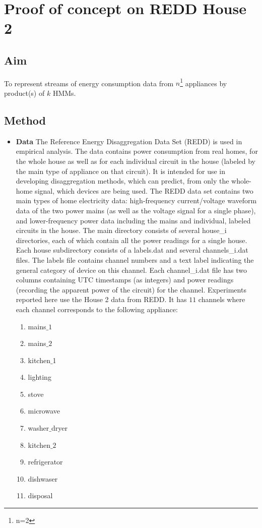 \documentclass[10pt, conference, compsocconf]{IEEEtran}
\begin{document}
\section{Proof of concept on REDD House 2}
\subsection{Aim}
 To represent streams of energy consumption data from $n$\footnote{n=2} appliances by product(s) of $k$ HMMs.
 
\subsection{Method} 

\begin{itemize}
\item \textbf{Data } The Reference Energy Disaggregation Data Set (REDD) is used in empirical analysis. The data contains power consumption from real homes, for the whole house as well as for each individual circuit in
the house (labeled by the main type of appliance on that circuit). It is intended for use in developing disaggregation methods, which can predict, from only the whole-home signal, which devices are being used. The REDD data set contains two main types of home electricity data: high-frequency current/voltage waveform data of the two power mains (as well as the voltage signal for a single phase), and lower-frequency power data including the mains and individual, labeled circuits in the house. The main directory consists of several house\_i directories, each of which contain all the power readings for a single house.  Each house subdirectory consists of a labels.dat and several channels\_i.dat files. The labels file contains channel numbers and a text label indicating the general category of device on this channel. Each channel\_i.dat file has two columns containing UTC timestamps (as integers) and power readings (recording the apparent power of the circuit) for the channel.
Experiments reported here use the House 2 data from REDD. It has $11$ channels where each channel corresponds to the following appliance: 
\begin{enumerate}
\item mains$\_1$ 
\item mains$\_2$ 
\item kitchen$\_$1
\item lighting
\item stove 
\item microwave
\item washer$\_$dryer
\item kitchen$\_2$
\item refrigerator
\item dishwaser
\item disposal
\end{enumerate}


\end{itemize}
\end{document}

